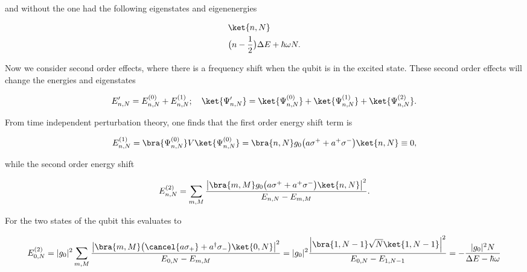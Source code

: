 \noindent and  without the    one had
the following eigenstates and eigenenergies

\begin{equation}\label{secStates}
  \begin{aligned}
    &\ket{n,N}\\
    &\big(n-\frac{1}{2}\big)\Delta E + \hbar\omega N.
  \end{aligned}
\end{equation}

\noindent Now we consider second order effects, where there
is  a frequency  shift when  the  qubit is  in the  excited
state.  These second order effects will change the energies
and eigenstates

\begin{equation}\label{secEi}
  E'_{n,N} = E_{n,N}^{(0)} + E_{n,N}^{(1)};\quad \ket{\Psi'_{n,N}}=\ket{\Psi^{(0)}_{n,N}}+\ket{\Psi^{(1)}_{n,N}}+\ket{\Psi^{(2)}_{n,N}}.
\end{equation} 


\begin{figure}[h]
   
\end{figure}

\noindent  From time  independent perturbation  theory, one
finds that the first order energy shift term is

\begin{equation}\label{sec1st}
  E_{n,N}^{(1)} = \bra{\Psi^{(0)}_{n,N}}V\ket{\Psi^{(0)}_{n,N}} = \bra{n,N}g_0\big(a\sigma^{+}+a^{+}\sigma^{-}\big)\ket{n,N} \equiv 0,
\end{equation}

\noindent while the second order energy shift

\begin{equation}\label{sec2nd}
  E_{n,N}^{(2)} = \sum_{m,M}\frac{\left|\bra{m,M}g_0\big(a\sigma^{+}+a^{+}\sigma^{-}\big)\ket{n,N}\right|^2}{E_{n,N}-E_{m,M}}.
\end{equation}

\noindent For the two states of the qubit this evaluates to

\begin{equation}\label{sec0}
  E_{0,N}^{(2)} = |g_0|^2\sum_{m,M}\frac{\left|\bra{m,M}\big(\cancel{a\sigma_{+}}+a^{\dagger}\sigma_{-}\big)\ket{0,N}\right|^2}{E_{0,N}-E_{m,M}}= |g_0|^2\frac{\left|\bra{1,N-1}\sqrt{N}\ket{1,N-1}\right|^2}{E_{0,N}-E_{1,N-1}} = -\frac{|g_0|^2N}{\Delta E - \hbar\omega}
\end{equation}


